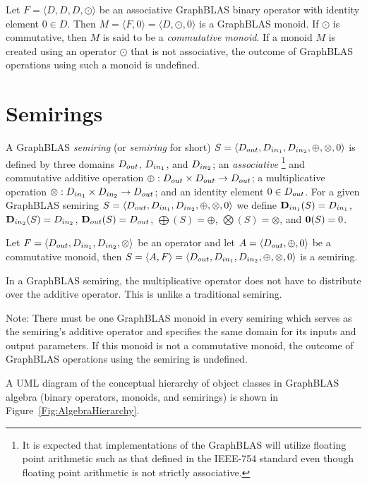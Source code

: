 Let $F = \langle D,D,D,\odot \rangle$ be an associative GraphBLAS binary operator
with identity element $0 \in D$.  Then $M = \langle F,0 \rangle = \langle
D,\odot,0 \rangle$ is a GraphBLAS monoid. If $\odot$ is commutative,
then $M$ is said to be a \emph{commutative monoid}.
If a monoid $M$ is created using an operator $\odot$ that is
not associative, the outcome of GraphBLAS operations using such a monoid is undefined.

\section{Semirings}

A GraphBLAS \emph{semiring} (or \emph{semiring} for short)
$S=\langle \mbox{$D_{out}$}, \mbox{$D_{in_{1}}$}, \mbox{$D_{in_{2}}$}, \oplus, \otimes, 0 \rangle$ is defined by
three domains $\mbox{$D_{out}$}$, $\mbox{$D_{in_{1}}$}$, and $\mbox{$D_{in_{2}}$}$; an \emph{associative}
\footnote{\label{Foot:associative}It is expected 
that implementations of the GraphBLAS will utilize floating point arithmetic 
such as that defined in the IEEE-754 standard even though
floating point arithmetic is not strictly associative.} 
and commutative
additive operation $\oplus : \mbox{$D_{out}$} \times \mbox{$D_{out}$} \rightarrow \mbox{$D_{out}$}$; 
a multiplicative operation $\otimes : \mbox{$D_{in_{1}}$} \times \mbox{$D_{in_{2}}$} \rightarrow
\mbox{$D_{out}$}$; and an identity element $0 \in \mbox{$D_{out}$}$.
For a given GraphBLAS semiring $S=\langle \mbox{$D_{out}$}, \mbox{$D_{in_{1}}$},
\mbox{$D_{in_{2}}$}, \oplus,\otimes,0 \rangle$ we define $\mbox{$\mathbf{D}_{in_{1}}$}(S) = \mbox{$D_{in_{1}}$}$,
$\mbox{$\mathbf{D}_{in_{2}}$}(S) = \mbox{$D_{in_{2}}$}$, $\mbox{$\mathbf{D}_{out}$}(S) = \mbox{$D_{out}$}$, $\mathbf{\bigoplus}(S) =
\oplus$, $\mathbf{\bigotimes}(S) = \otimes$, and ${\bf 0}(S) = 0$. 

Let $F = \langle \mbox{$D_{out}$},\mbox{$D_{in_{1}}$},\mbox{$D_{in_{2}}$},\otimes \rangle$ be an operator
and let $A = \langle \mbox{$D_{out}$},\oplus,0 \rangle$ be a commutative monoid,
then $S= \langle A,F \rangle = \langle \mbox{$D_{out}$},\mbox{$D_{in_{1}}$},\mbox{$D_{in_{2}}$},\oplus,\otimes,0 \rangle$
is a semiring.

In a GraphBLAS semiring, the multiplicative operator does not have to distribute over the additive operator. 
This is unlike a traditional semiring.

Note: There must be one GraphBLAS monoid in every semiring which 
serves as the semiring's additive operator and  
specifies the same domain for its inputs and output parameters. 
If this monoid is not a commutative monoid, the outcome of GraphBLAS
operations using the semiring is undefined.

A UML diagram of the conceptual hierarchy of object classes in GraphBLAS
algebra (binary operators, monoids, and semirings) is shown in 
Figure~\ref{Fig:AlgebraHierarchy}.

